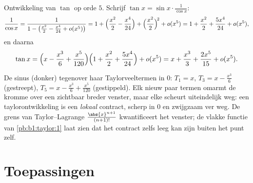 \begin{example}\label{ex:b1:taylor:tan}
Ontwikkeling van $\tan$ op orde $5$. Schrijf $\tan x = \sin x
\cdot \frac{1}{\cos x}$:
\[
\frac{1}{\cos x} = \frac{1}{1 - \bigl(\frac{x^2}{2} - \frac{x^4}{24}
+ o(x^5)\bigr)}
= 1 + \Bigl(\frac{x^2}{2} - \frac{x^4}{24}\Bigr)
+ \Bigl(\frac{x^2}{2}\Bigr)^{\!2} + o(x^5)
= 1 + \frac{x^2}{2} + \frac{5x^4}{24} + o(x^5),
\]
en daarna
\[
\tan x = \Bigl(x - \frac{x^3}{6} + \frac{x^5}{120}\Bigr)
\Bigl(1 + \frac{x^2}{2} + \frac{5x^4}{24}\Bigr) + o(x^5)
= x + \frac{x^3}{3} + \frac{2x^5}{15} + o(x^5) .
\]
\end{example}

\begin{omfigure}

{\small De sinus (donker) tegenover haar Taylorveeltermen in $0$:
$T_1 = x$, $T_3 = x - \frac{x^3}{6}$ (gestreept), $T_5 = x -
\frac{x^3}{6} + \frac{x^5}{120}$ (gestippeld). Elk nieuw paar
termen omarmt de kromme over een zichtbaar breder venster, maar
elke  scheurt uiteindelijk weg: een taylorontwikkeling is
een \emph{lokaal} contract, scherp in $0$ en zwijgzaam ver weg. De
grens van Taylor--Lagrange $\frac{\abs{x}^{n+1}}{(n+1)!}$
kwantificeert het venster; de vlakke functie van
\cref{pb:b1:taylor:1} laat zien dat het contract zelfs leeg kan
zijn buiten het punt zelf.}
\end{omfigure}

\section{Toepassingen}

